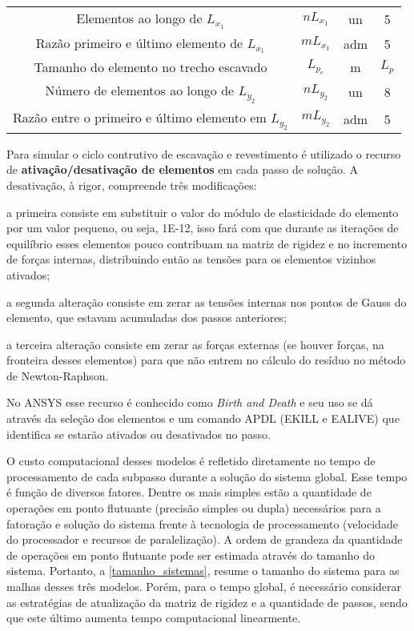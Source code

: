 \begin{table}[H]
\begin{tabular}{c c c c}
		Elementos ao longo de $L_{x_1}$ & $nL_{x_1}$ & un & 5 \\
		Razão primeiro e último elemento de $L_{x_1}$ & $mL_{x_1}$ & adm & 5 \\				
		Tamanho do elemento no trecho escavado & $L_{p_e}$ & m & $L_{p}$ \\	
		Número de elementos ao longo de $L_{y_2}$ & $nL_{y_2}$ & un & 8 \\			
		Razão entre o primeiro e último elemento em $L_{y_2}$ & $mL_{y_2}$ & adm & 5 \\				
		\hline
	\end{tabular}
	\normalsize
\end{table}

Para simular o ciclo contrutivo de escavação e revestimento é utilizado o recurso de \textbf{ativação/desativação de elementos} em cada passo de solução. A desativação, à rigor, compreende três modificações:
\begin{alineas}
	
	\item a primeira consiste em substituir o valor do módulo de elasticidade do elemento por um valor pequeno, ou seja, 1E-12, isso fará com que durante as iterações de equilíbrio esses elementos pouco contribuam na matriz de rigidez e no incremento de forças internas, distribuindo então as tensões para os elementos vizinhos ativados;
	
	\item a segunda alteração consiste em zerar as tensões internas nos pontos de Gauss do elemento, que estavam acumuladas dos passos anteriores; 
	
	\item a terceira alteração consiste em zerar as forças externas (se houver forças, na fronteira desses elementos) para que não entrem no cálculo do resíduo no método de Newton-Raphson.
	
\end{alineas}

No ANSYS esse recurso é conhecido como \textit{Birth and Death} e seu uso se dá através da seleção dos elementos e um comando APDL (EKILL e EALIVE) que identifica se estarão ativados ou desativados no passo.

O custo computacional desses modelos é refletido diretamente no tempo de processamento de cada subpasso durante a solução do sistema global. Esse tempo é função de diversos fatores. Dentre os mais simples estão a quantidade de operações em ponto flutuante (precisão simples ou dupla) necessários para a fatoração e solução do sistema frente à tecnologia de processamento (velocidade do processador e recursos de paralelização). A ordem de grandeza da quantidade de operações em ponto flutuante pode ser estimada através do tamanho do sistema. Portanto, a \autoref{tamanho_sistemas}, resume o tamanho do sistema para as malhas desses três modelos. Porém, para o tempo global, é necessário considerar as estratégias de atualização da matriz de rigidez e a quantidade de passos, sendo que este último aumenta tempo computacional linearmente.

